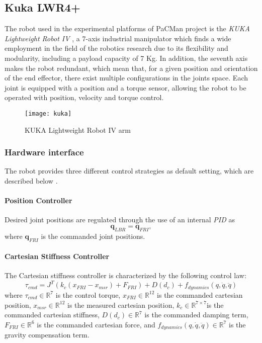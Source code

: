 \subsection{Kuka LWR4+}
\label{sec:kuka}

The robot used in the experimental platforms of PaCMan project is the \textit{KUKA Lightweight Robot IV} \cite{webkuka},  a 7-axis industrial manipulator which finds a wide employment in the field of the robotics research due to its flexibility and modularity, including a payload capacity of 7 Kg. In addition, the seventh axis makes the robot redundant, which mean that, for a given position and orientation of the end effector, there exist multiple configurations in the joints space. Each joint is equipped with a position and a torque sensor, allowing the robot to be operated with position, velocity and torque control. 

\begin{figure}[h]
\centering
\texttt{[image: kuka]}
\caption{KUKA Lightweight Robot IV arm}
\end{figure}


\subsubsection{Hardware interface}
The robot provides three different control strategies as default setting, which are described below \cite{kukafri}.

\paragraph{Position Controller}
Desired joint positions are regulated through the use of an internal \textit{PID} as
\begin{equation}
\mathbf{q}_{LBR} = \mathbf{q}_{FRI},
\label{eq:positioncontroller}
\end{equation}
where $\mathbf{q}_{FRI}$ is the commanded joint positions.

\paragraph{Cartesian Stiffness Controller}
The Cartesian stiffness controller is characterized by the following control law:
\begin{equation}
\tau_{cmd} = J^T(k_c(x_{FRI} - x_{msr}) + F_{FRI}) + D(d_c) + f_{dynamics}(q,\dot{q},\ddot{q})
\label{eq:cartesianstiffnesscontroller}
\end{equation}
where $\tau_{cmd}\in\mathbb{R}^7$ is the  control torque, $x_{FRI}\in\mathbb{R}^{12}$ is the commanded cartesian position, $x_{msr}\in\mathbb{R}^{12}$ is the measured cartesian position, $k_c\in\mathbb{R}^{7\times 7}$is the commanded cartesian stiffness, $D(d_c)\in\mathbb{R}^7$ is the commanded damping term, $F_{FRI}\in\mathbb{R}^6$ is the commanded cartesian force, and $f_{dynamics}(q,\dot{q},\ddot{q})\in\mathbb{R}^7$ is the gravity compensation term.

